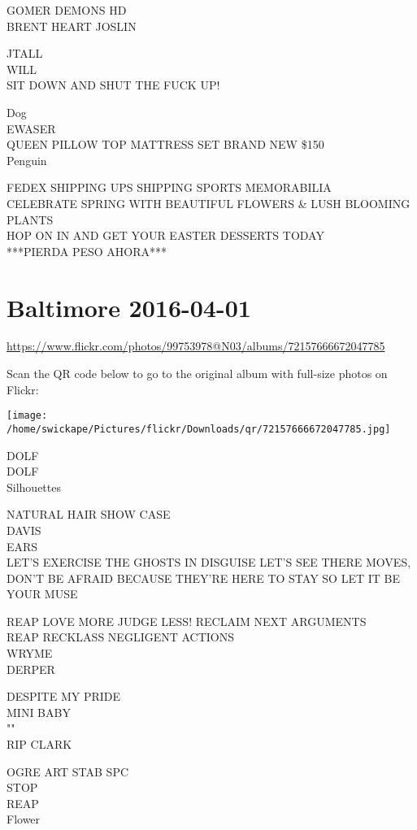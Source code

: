 \documentclass[10pt,letterpaper]{article}
\begin{document}
GOMER DEMONS HD\\
BRENT HEART JOSLIN

JTALL\\
WILL\\
SIT DOWN AND SHUT THE FUCK UP!

Dog\\
EWASER\\
QUEEN PILLOW TOP MATTRESS SET BRAND NEW \$150\\
Penguin

FEDEX SHIPPING UPS SHIPPING SPORTS MEMORABILIA\\
CELEBRATE SPRING WITH BEAUTIFUL FLOWERS \& LUSH BLOOMING PLANTS\\
HOP ON IN AND GET YOUR EASTER DESSERTS TODAY\\
***PIERDA PESO AHORA***
\pagebreak

\section*{Baltimore 2016-04-01}

\url{https://www.flickr.com/photos/99753978@N03/albums/72157666672047785}

Scan the QR code below to go to the original album with full-size photos on Flickr:

\texttt{[image: /home/swickape/Pictures/flickr/Downloads/qr/72157666672047785.jpg]}
\pagebreak

DOLF\\
DOLF\\
Silhouettes

NATURAL HAIR SHOW CASE\\
DAVIS\\
EARS\\
LET'S EXERCISE THE GHOSTS IN DISGUISE LET'S SEE THERE MOVES, DON'T BE AFRAID BECAUSE THEY'RE HERE TO STAY SO LET IT BE YOUR MUSE

REAP LOVE MORE JUDGE LESS! RECLAIM NEXT ARGUMENTS\\
REAP RECKLASS NEGLIGENT ACTIONS\\
WRYME\\
DERPER

DESPITE MY PRIDE\\
MINI BABY\\
""\\
RIP CLARK

OGRE ART STAB SPC\\
STOP\\
REAP\\
Flower
\end{document}
